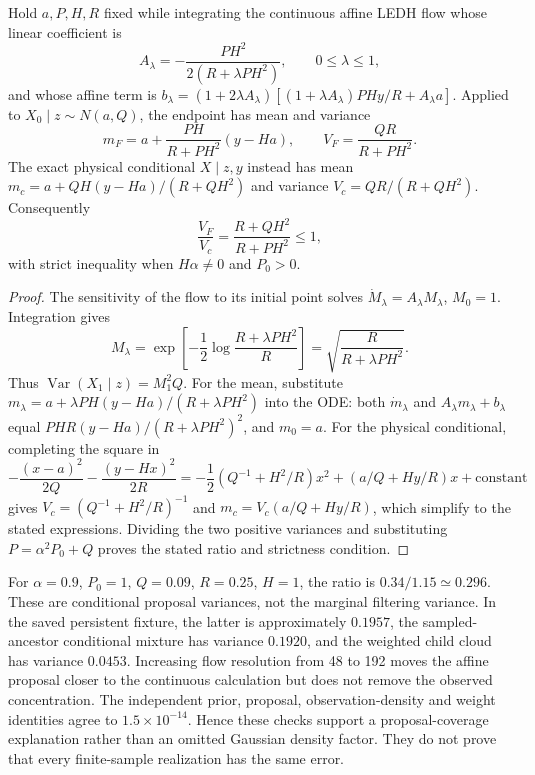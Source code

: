 \begin{proposition}
\label{prop:bg-conditional-spread}
Hold $a,P,H,R$ fixed while integrating the continuous affine LEDH flow whose
linear coefficient is
\begin{equation}
 A_\lambda=-\frac{PH^2}{2(R+\lambda PH^2)},\qquad 0\leq\lambda\leq1,
 \label{eq:bg-scalar-flow-coefficient}
\end{equation}
and whose affine term is
$b_\lambda=(1+2\lambda A_\lambda)
[(1+\lambda A_\lambda)PHy/R+A_\lambda a]$.
Applied to $X_0\mid z\sim N(a,Q)$, the endpoint has mean and variance
\begin{equation}
 m_F=a+\frac{PH}{R+PH^2}(y-Ha),\qquad
 V_F=\frac{QR}{R+PH^2}.
 \label{eq:bg-conditional-flow}
\end{equation}
The exact physical conditional $X\mid z,y$ instead has mean
$m_c=a+QH(y-Ha)/(R+QH^2)$ and variance $V_c=QR/(R+QH^2)$.
Consequently
\begin{equation}
 \frac{V_F}{V_c}=\frac{R+QH^2}{R+PH^2}\leq1,
 \label{eq:bg-conditional-variance-ratio}
\end{equation}
with strict inequality when $H\alpha\ne0$ and $P_0>0$.
\end{proposition}
\begin{proof}
The sensitivity of the flow to its initial point solves
$\dot M_\lambda=A_\lambda M_\lambda$, $M_0=1$. Integration gives
\[
 M_\lambda=\exp\!\left[-\frac12
   \log\frac{R+\lambda PH^2}{R}\right]
 =\sqrt{\frac{R}{R+\lambda PH^2}}.
\]
Thus $\operatorname{Var}(X_1\mid z)=M_1^2Q$.
For the mean, substitute
$m_\lambda=a+\lambda PH(y-Ha)/(R+\lambda PH^2)$ into the ODE:
both $\dot m_\lambda$ and $A_\lambda m_\lambda+b_\lambda$ equal
$PHR(y-Ha)/(R+\lambda PH^2)^2$, and $m_0=a$.
For the physical conditional, completing the square in
\[
 -\frac{(x-a)^2}{2Q}-\frac{(y-Hx)^2}{2R}
 =-\frac12\left(Q^{-1}+H^2/R\right)x^2
   +\left(a/Q+Hy/R\right)x+\text{constant}
\]
gives $V_c=(Q^{-1}+H^2/R)^{-1}$ and
$m_c=V_c(a/Q+Hy/R)$, which simplify to the stated expressions.
Dividing the two positive variances and substituting
$P=\alpha^2P_0+Q$ proves the stated ratio and strictness condition.
\end{proof}

For $\alpha=0.9$, $P_0=1$, $Q=0.09$, $R=0.25$, $H=1$, the ratio is
$0.34/1.15\simeq0.296$. These are conditional proposal variances, not
the marginal filtering variance. In the saved persistent fixture, the latter
is approximately $0.1957$, the sampled-ancestor conditional mixture has
variance $0.1920$, and the weighted child cloud has variance $0.0453$.
Increasing flow resolution from 48 to 192 moves the affine proposal closer
to the continuous calculation but does not remove the observed concentration.
The independent prior, proposal, observation-density and weight identities
agree to $1.5\times10^{-14}$. Hence these checks support a proposal-coverage
explanation rather than an omitted Gaussian density factor. They do not prove
that every finite-sample realization has the same error.

